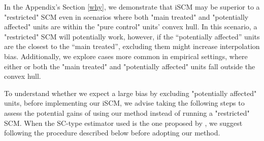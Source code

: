 In the Appendix's Section \ref{why}, we demonstrate that iSCM may be superior to a "restricted" SCM even in scenarios where both "main treated" and "potentially affected" units are within the "pure control" units' convex hull. In this scenario, a "restricted" SCM will potentially work, however, if the “potentially affected” units are the closest to the “main treated”, excluding them might increase interpolation bias. Additionally, we explore cases more common in empirical settings, where either or both the "main treated" and "potentially affected" units fall outside the convex hull.

To understand whether we expect a large bias by excluding "potentially affected" units, before implementing our iSCM, we advise taking the following steps to assess the potential gains of using our method instead of running a "restricted" SCM. When the SC-type estimator used is the one proposed by \cite{Aba2010}, we suggest following the procedure described below before adopting our method.




